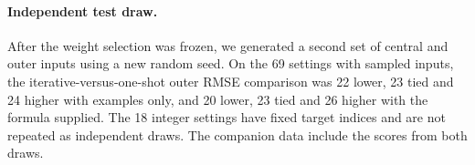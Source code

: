 \paragraph{Independent test draw.} After the weight selection was frozen, we generated a second set of central and outer inputs using a new random seed. On the 69 settings with sampled inputs, the iterative-versus-one-shot outer RMSE comparison was 22 lower, 23 tied and 24 higher with examples only, and 20 lower, 23 tied and 26 higher with the formula supplied. The 18 integer settings have fixed target indices and are not repeated as independent draws. The companion data include the scores from both draws.

